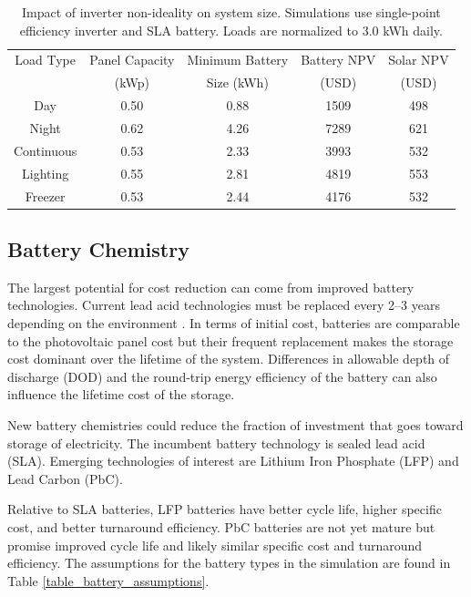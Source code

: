 \documentclass[conference]{IEEEtran}
\begin{document}
\begin{table}
\centering
\begin{tabular}{c c c c c}
Load Type     & Panel Capacity & Minimum Battery & Battery NPV & Solar NPV \\
              & (kWp)          & Size (kWh)      & (USD)       & (USD)     \\
\hline
Day        & 0.50 & 0.88 & 1509 & 498 \\
Night      & 0.62 & 4.26 & 7289 & 621 \\
Continuous & 0.53 & 2.33 & 3993 & 532 \\
Lighting   & 0.55 & 2.81 & 4819 & 553 \\
Freezer    & 0.53 & 2.44 & 4176 & 532 \\

\end{tabular}
\caption{Impact of inverter non-ideality on system size.  
Simulations use single-point efficiency inverter and 
SLA battery.
Loads are normalized to 3.0 kWh daily.}
\label{table_inverter}
\end{table}

\subsection{Battery Chemistry}

The largest potential for cost reduction can come from improved
battery technologies.
Current lead acid technologies must be replaced every 2--3 years
depending on the environment \cite{lead acid battery life}.
In terms of initial cost, batteries are comparable to the photovoltaic
panel cost but their frequent replacement makes the storage cost
dominant over the lifetime of the system.
Differences in allowable depth of discharge (DOD) and the round-trip
energy efficiency of the battery can also influence the lifetime
cost of the storage.

New battery chemistries could reduce the fraction of investment
that goes toward storage of electricity.
The incumbent battery technology is sealed lead acid (SLA).
Emerging technologies of interest are Lithium Iron Phosphate
(LFP) and Lead Carbon (PbC).

Relative to SLA batteries, LFP batteries
have better cycle life, higher specific cost, and better
turnaround efficiency.
PbC batteries are not yet mature but promise improved cycle
life and likely similar specific cost and turnaround
efficiency.
The assumptions for the battery types in the simulation
are found in Table \ref{table_battery_assumptions}.
\end{document}
